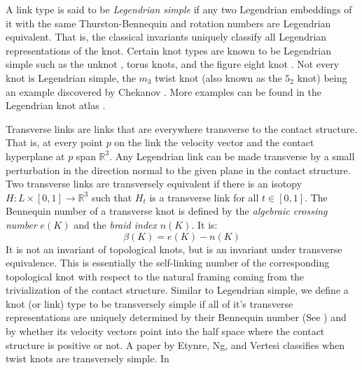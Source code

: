 \documentclass{article}
\theoremstyle{plain}
\begin{document}
        A link type is said to be \textit{Legendrian simple} if
        any two Legendrian embeddings of it with the same Thurston-Bennequin
        and rotation numbers are Legendrian equivalent. That is, the classical
        invariants uniquely classify all Legendrian representations of the knot.
        Certain knot types are known to be Legendrian simple such as the unknot
        \cite{EliashbergFraserClassificationTopTrivialLegKnots}, torus knots,
        and the figure eight knot \cite{EtnyreHondaContactTopologyI}.
        Not every knot is Legendrian simple, the $m_{3}$ twist knot (also
        known as the $5_{2}$ knot) being an example discovered by Chekanov
        \cite{ChekanovDifAlgOfLegLinks}. More examples can be found in the
        Legendrian knot atlas \cite{LegendrianKnotAtlas}.
        \par\hfill\par
        Transverse links are links that are everywhere transverse to the
        contact structure. That is, at every point $p$ on the link the velocity
        vector and the contact hyperplane at $p$ span $\mathbb{R}^{3}$. Any Legendrian
        link can be made transverse by a small perturbation in the direction
        normal to the given plane in the contact structure.
        Two transverse links are transversely equivalent if there is an
        isotopy $H:L\times[0,1]\rightarrow\mathbb{R}^{3}$ such that $H_{t}$ is a
        transverse link for all $t\in[0,1]$. The Bennequin number of a
        transverse knot is defined by the \textit{algebraic crossing number}
        $e(K)$ and the \textit{braid index} $n(K)$. It is:
        \begin{equation}
            \beta(K)=e(K)-n(K)
        \end{equation}
        It is not an invariant of topological knots, but is an invariant under
        transverse equivalence. This is essentially the self-linking number of
        the corresponding topological knot with respect to the natural framing
        coming from the trivialization of the contact structure.
        Similar to Legendrian simple, we define a knot
        (or link) type to be transversely simple if all of it's transverse
        representations are uniquely determined by their Bennequin number
        (See \cite{BirmanWrinkleTransversallySimpleKnots}) and by whether its
        velocity vectors point into the half space where the contact structure
        is positive or not. A paper by Etynre, Ng, and Vertesi
        \cite{EtnyreEtAlLegendrianAndTransverseTwistKnots}
        classifies when twist knots are transversely simple. In
\end{document}
